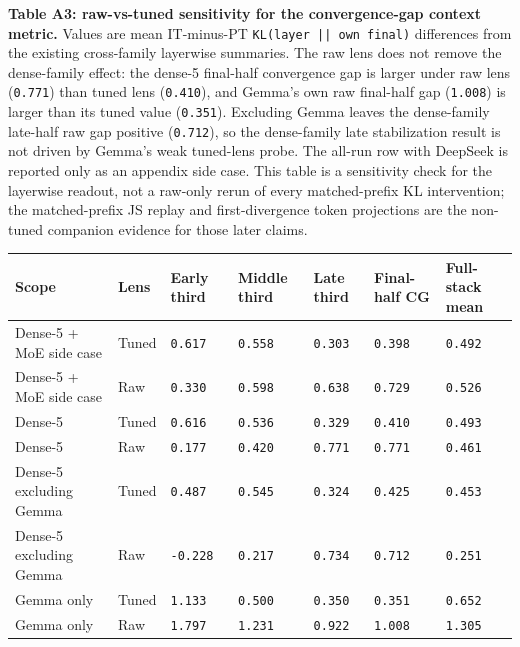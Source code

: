\documentclass[11pt]{article}
\begin{document}
\textbf{Table A3: raw-vs-tuned sensitivity for the convergence-gap context metric.} Values are mean IT-minus-PT \texttt{KL(layer || own final)} differences from the existing cross-family layerwise summaries. The raw lens does not remove the dense-family effect: the dense-5 final-half convergence gap is larger under raw lens (\texttt{0.771}) than tuned lens (\texttt{0.410}), and Gemma's own raw final-half gap (\texttt{1.008}) is larger than its tuned value (\texttt{0.351}). Excluding Gemma leaves the dense-family late-half raw gap positive (\texttt{0.712}), so the dense-family late stabilization result is not driven by Gemma's weak tuned-lens probe. The all-run row with DeepSeek is reported only as an appendix side case. This table is a sensitivity check for the layerwise readout, not a raw-only rerun of every matched-prefix KL intervention; the matched-prefix JS replay and first-divergence token projections are the non-tuned companion evidence for those later claims.

\begin{table}[t]
\centering
\small
\setlength{\tabcolsep}{3pt}
\begin{tabularx}{\linewidth}{@{}>{\raggedright\arraybackslash}X >{\raggedright\arraybackslash}X >{\raggedright\arraybackslash}X >{\raggedright\arraybackslash}X >{\raggedright\arraybackslash}X >{\raggedright\arraybackslash}X >{\raggedright\arraybackslash}X@{}}
\toprule
Scope & Lens & Early third & Middle third & Late third & Final-half CG & Full-stack mean \\
\midrule
Dense-5 + MoE side case & Tuned & \texttt{0.617} & \texttt{0.558} & \texttt{0.303} & \texttt{0.398} & \texttt{0.492} \\
Dense-5 + MoE side case & Raw & \texttt{0.330} & \texttt{0.598} & \texttt{0.638} & \texttt{0.729} & \texttt{0.526} \\
Dense-5 & Tuned & \texttt{0.616} & \texttt{0.536} & \texttt{0.329} & \texttt{0.410} & \texttt{0.493} \\
Dense-5 & Raw & \texttt{0.177} & \texttt{0.420} & \texttt{0.771} & \texttt{0.771} & \texttt{0.461} \\
Dense-5 excluding Gemma & Tuned & \texttt{0.487} & \texttt{0.545} & \texttt{0.324} & \texttt{0.425} & \texttt{0.453} \\
Dense-5 excluding Gemma & Raw & \texttt{-0.228} & \texttt{0.217} & \texttt{0.734} & \texttt{0.712} & \texttt{0.251} \\
Gemma only & Tuned & \texttt{1.133} & \texttt{0.500} & \texttt{0.350} & \texttt{0.351} & \texttt{0.652} \\
Gemma only & Raw & \texttt{1.797} & \texttt{1.231} & \texttt{0.922} & \texttt{1.008} & \texttt{1.305} \\
\bottomrule
\end{tabularx}
\end{table}
\end{document}
